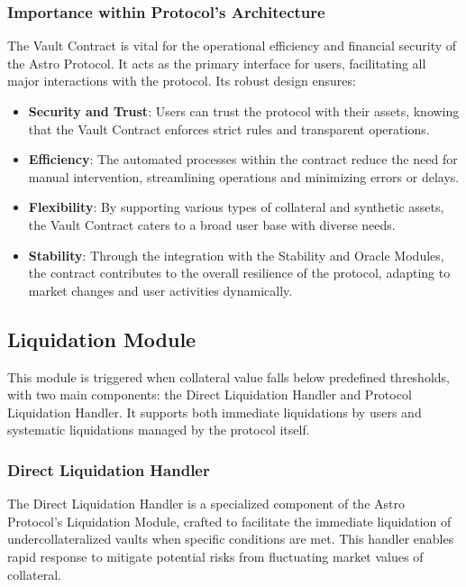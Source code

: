 \subsubsection{Importance within Protocol’s Architecture}
The Vault Contract is vital for the operational efficiency and financial security of the Astro Protocol. It acts as the primary interface for users, facilitating all major interactions with the protocol. Its robust design ensures:
\begin{itemize}
    \item \textbf{Security and Trust}: Users can trust the protocol with their assets, knowing that the Vault Contract enforces strict rules and transparent operations.
    \item \textbf{Efficiency}: The automated processes within the contract reduce the need for manual intervention, streamlining operations and minimizing errors or delays.
    \item \textbf{Flexibility}: By supporting various types of collateral and synthetic assets, the Vault Contract caters to a broad user base with diverse needs.
    \item \textbf{Stability}: Through the integration with the Stability and Oracle Modules, the contract contributes to the overall resilience of the protocol, adapting to market changes and user activities dynamically.
\end{itemize}

\subsection{Liquidation Module}
This module is triggered when collateral value falls below predefined thresholds, with two main components: the Direct Liquidation Handler and Protocol Liquidation Handler. It supports both immediate liquidations by users and systematic liquidations managed by the protocol itself.

\subsubsection{Direct Liquidation Handler}
The Direct Liquidation Handler is a specialized component of the Astro Protocol’s Liquidation Module, crafted to facilitate the immediate liquidation of undercollateralized vaults when specific conditions are met. This handler enables rapid response to mitigate potential risks from fluctuating market values of collateral.

